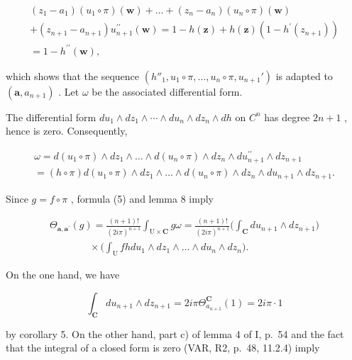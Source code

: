 \[
\begin{array}{c} (z _ {1} - a _ {1}) (u _ {1} \circ \pi) (\boldsymbol {w}) + \dots + (z _ {n} - a _ {n}) (u _ {n} \circ \pi) (\boldsymbol {w}) \\ + (z _ {n + 1} - a _ {n + 1}) u _ {n + 1} ^ {\prime \prime} (\boldsymbol {w}) = 1 - h (\boldsymbol {z}) + h (\boldsymbol {z}) (1 - h ^ {\prime} (z _ {n + 1})) \\ = 1 - h ^ {\prime \prime} (\boldsymbol {w}), \end{array}
\]

which shows that the sequence \((h''_{1}, u_{1} \circ \pi, \ldots, u_{n} \circ \pi, u_{n+1}')\) is adapted to \((\boldsymbol{a}, a_{n+1})\) . Let \(\omega\) be the associated differential form.

The differential form \(du_{1} \wedge dz_{1} \wedge \cdots \wedge du_{n} \wedge dz_{n} \wedge dh\) on \(C^{n}\) has degree \(2n + 1\) , hence is zero. Consequently,

\[
\begin{array}{l} \omega = d (u _ {1} \circ \pi) \wedge d z _ {1} \wedge \dots \wedge d (u _ {n} \circ \pi) \wedge d z _ {n} \wedge d u _ {n + 1} ^ {\prime \prime} \wedge d z _ {n + 1} \\ = (h \circ \pi) d (u _ {1} \circ \pi) \wedge d z _ {1} \wedge \dots \wedge d (u _ {n} \circ \pi) \wedge d z _ {n} \wedge d u _ {n + 1} \wedge d z _ {n + 1}. \end{array}
\]

Since \(g = f \circ \pi\) , formula (5) and lemma 8 imply

\[
\begin{array}{c} \Theta_ {\boldsymbol {a}, \boldsymbol {a} ^ {\prime}} (g) = \frac {(n + 1) !}{(2 i \pi) ^ {n + 1}} \int_ {\mathrm{U} \times \mathbf {C}} g \omega = \frac {(n + 1) !}{(2 i \pi) ^ {n + 1}} \Big (\int_ {\mathbf {C}} d u _ {n + 1} \wedge d z _ {n + 1} \Big) \\ \qquad \qquad \times \Big (\int_ {\mathrm{U}} f h   d u _ {1} \wedge d z _ {1} \wedge \dots \wedge d u _ {n} \wedge d z _ {n} \Big). \end{array}
\]

On the one hand, we have

\[
\int_ {\mathbf {C}} d u _ {n + 1} \wedge d z _ {n + 1} = 2 i \pi \Theta_ {a _ {n + 1}} ^ {\mathbf {C}} (1) = 2 i \pi \cdot 1
\]

by corollary 5. On the other hand, part c) of lemma 4 of I, p.~54 and the fact that the integral of a closed form is zero (VAR, R2, p.~48, 11.2.4) imply

